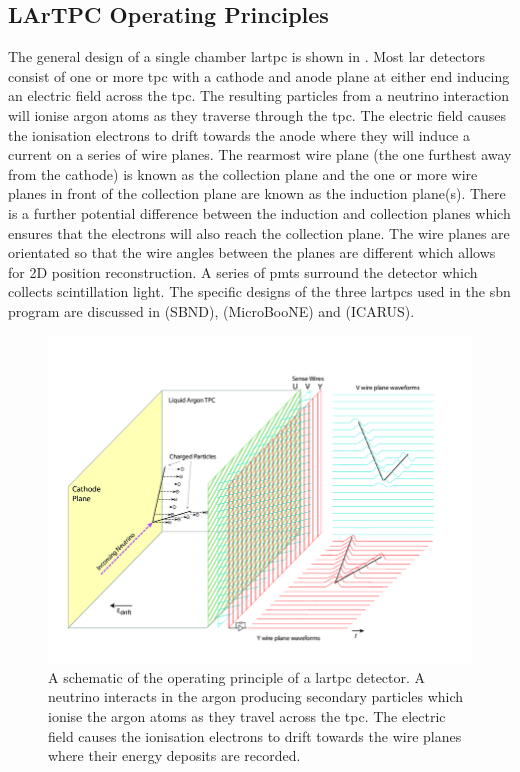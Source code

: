 \subsection{LArTPC Operating Principles}
The general design of a single chamber \gls{lartpc} is shown in . Most \gls{lar} detectors consist of one or more \gls{tpc} with a cathode and anode plane at either end inducing an electric field across the \gls{tpc}. The resulting particles from a neutrino interaction will ionise argon atoms as they traverse through the \gls{tpc}. The electric field causes the ionisation electrons to drift towards the anode where they will induce a current on a series of wire planes. The rearmost wire plane (the one furthest away from the cathode) is known as the collection plane and the one or more wire planes in front of the collection plane are known as the induction plane(s). There is a further potential difference between the induction and collection planes which ensures that the electrons will also reach the collection plane. The wire planes are orientated so that the wire angles between the planes are different which allows for 2D position reconstruction. A series of \glspl{pmt} surround the detector which collects scintillation light. The specific designs of the three \glspl{lartpc} used in the \gls{sbn} program are discussed in  (SBND),  (MicroBooNE) and  (ICARUS).

\begin{figure}[h]
    \centering
    \includegraphics[width =\hugefigwidth]{figures-chap3/Operational-principle-of-the-MicroBooNE-LArTPC.png}
    \caption[Schematic of LArTPC detector.]{A schematic of the operating principle of a \gls{lartpc} detector. A neutrino interacts in the argon producing secondary particles which ionise the argon atoms as they travel across the \gls{tpc}. The electric field causes the ionisation electrons to drift towards the wire planes where their energy deposits are recorded. \cite{Design_and_Construction_of_the_MicroBooNE_Detector}}
    \label{fig:lartpc}
\end{figure}

